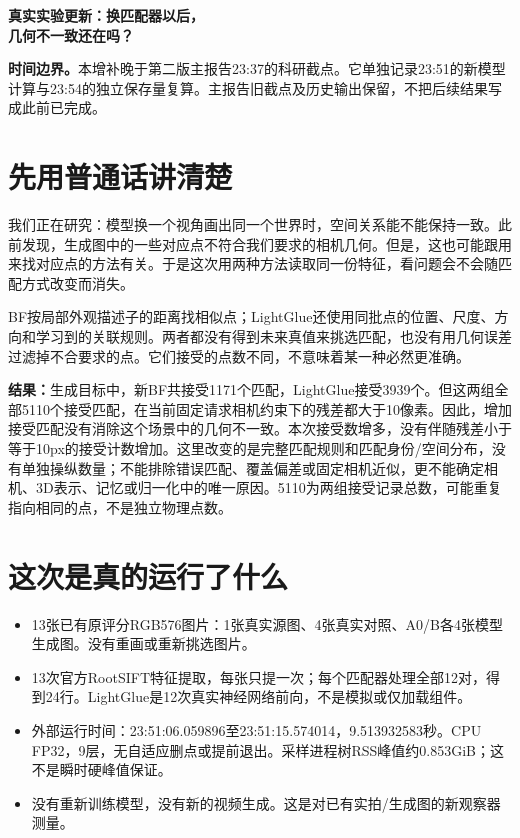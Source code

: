 \documentclass[UTF8,11pt,a4paper]{ctexart}
\begin{document}
\begin{center}{\LARGE\bfseries 真实实验更新：换匹配器以后，\\几何不一致还在吗？}\end{center}
\noindent\textbf{时间边界。}本增补晚于第二版主报告23:37的科研截点。它单独记录23:51的新模型计算与23:54的独立保存量复算。主报告旧截点及历史输出保留，不把后续结果写成此前已完成。
\section{先用普通话讲清楚}
我们正在研究：模型换一个视角画出同一个世界时，空间关系能不能保持一致。此前发现，生成图中的一些对应点不符合我们要求的相机几何。但是，这也可能跟用来找对应点的方法有关。于是这次用两种方法读取同一份特征，看问题会不会随匹配方式改变而消失。

BF按局部外观描述子的距离找相似点；LightGlue还使用同批点的位置、尺度、方向和学习到的关联规则。两者都没有得到未来真值来挑选匹配，也没有用几何误差过滤掉不合要求的点。它们接受的点数不同，不意味着某一种必然更准确。

\textbf{结果：}生成目标中，新BF共接受1171个匹配，LightGlue接受3939个。但这两组全部5110个接受匹配，在当前固定请求相机约束下的残差都大于10像素。因此，增加接受匹配没有消除这个场景中的几何不一致。本次接受数增多，没有伴随残差小于等于10px的接受计数增加。这里改变的是完整匹配规则和匹配身份/空间分布，没有单独操纵数量；不能排除错误匹配、覆盖偏差或固定相机近似，更不能确定相机、3D表示、记忆或归一化中的唯一原因。5110为两组接受记录总数，可能重复指向相同的点，不是独立物理点数。

\section{这次是真的运行了什么}
\begin{itemize}
\item 13张已有原评分RGB576图片：1张真实源图、4张真实对照、A0/B各4张模型生成图。没有重画或重新挑选图片。
\item 13次官方RootSIFT特征提取，每张只提一次；每个匹配器处理全部12对，得到24行。LightGlue是12次真实神经网络前向，不是模拟或仅加载组件。
\item 外部运行时间：23:51:06.059896至23:51:15.574014，9.513932583秒。CPU FP32，9层，无自适应删点或提前退出。采样进程树RSS峰值约0.853GiB；这不是瞬时硬峰值保证。
\item 没有重新训练模型，没有新的视频生成。这是对已有实拍/生成图的新观察器测量。
\end{itemize}
\clearpage
\end{document}
